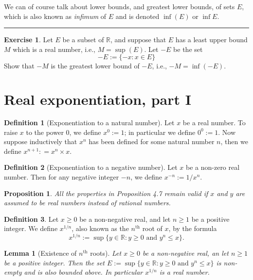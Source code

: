 \documentclass[
]{book}
\newtheorem{lemma}{Lemma}[chapter]
\newtheorem{proposition}{Proposition}[chapter]
\theoremstyle{definition}
\newtheorem{definition}{Definition}[chapter]
\theoremstyle{definition}
\theoremstyle{definition}
\newtheorem{exercise}{Exercise}[chapter]
\theoremstyle{definition}
\theoremstyle{remark}
\begin{document}
We can of course talk about lower bounds, and greatest lower bounds, of sets \(E\), which is also known as \emph{infimum} of \(E\) and is denoted \(\inf(E)\) or \(\inf E\).

\begin{center}\rule{0.5\linewidth}{0.5pt}\end{center}

\begin{exercise}
Let \(E\) be a subset of \(\mathbb{R}\), and suppose that \(E\) has a least upper bound \(M\) which is a real number, i.e., \(M=\sup(E)\). Let \(-E\) be the set
\[
-E:=\{-x:x\in E\}
\]
Show that \(-M\) is the greatest lower bound of \(-E\), i.e., \(-M=\inf(-E)\).
\end{exercise}

\section{Real exponentiation, part I}\label{real-exponentiation-part-i}

\begin{definition}[Exponentiation to a natural number]
Let \(x\) be a real number. To raise \(x\) to the power \(0\), we define \(x^0:=1\); in particular we define \(0^0:=1\). Now suppose inductively that \(x^n\) has been defined for some natural number \(n\), then we define \(x^{n+1} : = x^n\times x\).
\end{definition}

\begin{definition}[Exponentiation to a negative number]
Let \(x\) be a non-zero real number. Then for any negative integer \(-n\), we define \(x^{-n} := 1/x^n\).
\end{definition}

\begin{proposition}
All the properties in Proposition 4.7 remain valid if \(x\) and \(y\) are assumed to be real numbers instead of rational numbers.
\end{proposition}

\begin{definition}
Let \(x\geq 0\) be a non-negative real, and let \(n\geq 1\) be a positive integer. We define \(x^{1/n}\), also known as the \(n^{\text{th}}\) root of \(x\), by the formula
\[
x^{1/n}:=\sup\{y\in\mathbb{R}:y\geq0 \text{ and }y^n\leq x\}.
\]
\end{definition}

\begin{lemma}[Existence of $n^{\text{th}}$ roots]
Let \(x\geq 0\) be a non-negative real, an let \(n\geq 1\) be a positive integer. Then the set \(E:=\sup\{y\in\mathbb{R}:y\geq0 \text{ and }y^n\leq x\}\) is non-empty and is also bounded above. In particular \(x^{1/n}\) is a real number.
\end{lemma}
\end{document}
